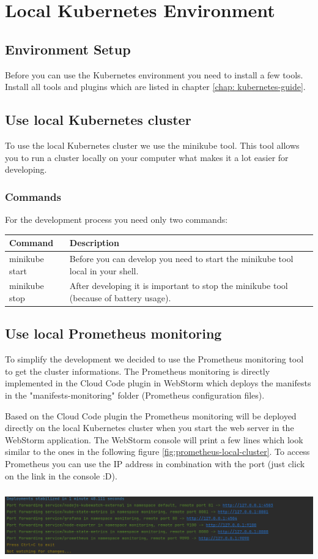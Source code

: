 \chapter{Local Kubernetes Environment}

\section{Environment Setup}
Before you can use the Kubernetes environment you need to install a few tools. Install all tools and plugins which are listed in chapter \ref{chap: kubernetes-guide}. 

\section{Use local Kubernetes cluster}
To use the local Kubernetes cluster we use the minikube tool. This tool allows you to run a cluster locally on your computer what makes it a lot easier for developing.

\subsection{Commands}
For the development process you need only two commands: \newline
\begin{tabular}{m{3cm} m{11cm}}
    \textbf{Command} & \textbf{Description} \\
    \hline
    minikube start & Before you can develop you need to start the minikube tool local in your shell. \\
    minikube stop & After developing it is important to stop the minikube tool (because of battery usage). \\
\end{tabular}

\section{Use local Prometheus monitoring}
To simplify the development we decided to use the Prometheus monitoring tool to get the cluster informations. The Prometheus monitoring is directly implemented in the Cloud Code plugin in WebStorm which deploys the manifests in the "manifests-monitoring" folder (Prometheus configuration files).

Based on the Cloud Code plugin the Prometheus monitoring will be deployed directly on the local Kubernetes cluster when you start the web server in the WebStorm application. The WebStorm console will print a few lines which look similar to the ones in the following figure \ref{fig:prometheus-local-cluster}. To access Prometheus you can use the IP address in combination with the port (just click on the link in the console :D). \newline

\label{fig:prometheus-local-cluster}
\includegraphics[height=3cm]{resources/prometheus_local_cluster.png}